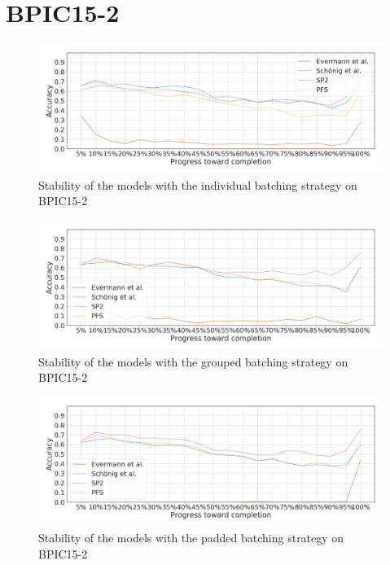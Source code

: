 \section*{BPIC15-2}
\begin{figure}[!htb]
    \centering
    \includegraphics[width=\textwidth]{gfx/bpic2015_2/individual_stability.png}
    \caption{Stability of the models with the individual batching strategy on BPIC15-2}
    \label{fig:bpic15-2-individual-stability}
\end{figure}
\begin{figure}[!htb]
    \centering
    \includegraphics[width=\textwidth]{gfx/bpic2015_2/grouped_stability.png}
    \caption{Stability of the models with the grouped batching strategy on BPIC15-2}
    \label{fig:bpic15-2-grouped-stability}
\end{figure}
\begin{figure}[!htb]
    \centering
    \includegraphics[width=\textwidth]{gfx/bpic2015_2/padded_stability.png}
    \caption{Stability of the models with the padded batching strategy on BPIC15-2}
    \label{fig:bpic15-2-padded-stability}
\end{figure}
